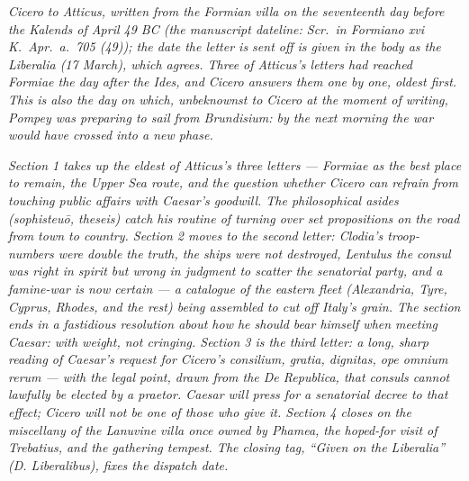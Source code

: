 
\textit{Cicero to Atticus, written from the Formian villa
on the seventeenth day before the Kalends of April 49 BC
(the manuscript dateline: \textit{Scr.\ in Formiano xvi
K.\ Apr.\ a.\ 705 (49)}); the date the letter is sent off
is given in the body as the Liberalia (17 March), which
agrees. Three of Atticus's letters had reached Formiae the
day after the Ides, and Cicero answers them one by one,
oldest first. This is also the day on which, unbeknownst
to Cicero at the moment of writing, Pompey was preparing
to sail from Brundisium: by the next morning the war would
have crossed into a new phase.}

\textit{Section 1 takes up the eldest of Atticus's three
letters --- Formiae as the best place to remain, the Upper
Sea route, and the question whether Cicero can refrain
from touching public affairs with Caesar's goodwill. The
philosophical asides (\textit{sophisteu\=o}, \textit{theseis})
catch his routine of turning over set propositions on the
road from town to country. Section 2 moves to the second
letter: Clodia's troop-numbers were double the truth, the
ships were not destroyed, Lentulus the consul was right in
spirit but wrong in judgment to scatter the senatorial
party, and a famine-war is now certain --- a catalogue of
the eastern fleet (Alexandria, Tyre, Cyprus, Rhodes, and
the rest) being assembled to cut off Italy's grain. The
section ends in a fastidious resolution about how he
should bear himself when meeting Caesar: with weight, not
cringing. Section 3 is the third letter: a long, sharp
reading of Caesar's request for Cicero's \textit{consilium,
gratia, dignitas, ope omnium rerum} --- with the legal
point, drawn from the \textit{De Republica}, that consuls
cannot lawfully be elected by a praetor. Caesar will press
for a senatorial decree to that effect; Cicero will not be
one of those who give it. Section 4 closes on the
miscellany of the Lanuvine villa once owned by Phamea, the
hoped-for visit of Trebatius, and the gathering tempest.
The closing tag, ``Given on the Liberalia'' (\textit{D.
Liberalibus}), fixes the dispatch date.}

